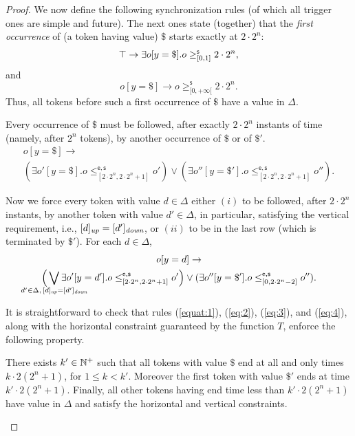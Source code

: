 \begin{proof}
We now define the following synchronization rules (of which all trigger ones are simple and future). The next ones state (together) that the \emph{first occurrence} of (a token having value) $\$$ starts exactly at $2\cdot 2^n$:
\begin{equation}\label{equat:1}
    \operatorname{\top} \to \exists o[y=\$]. o\geq^{\mathsf{s}}_{[0,1]} 2\cdot 2^n ,
\end{equation}
and 
\begin{equation}\label{eq:2}
    o[y=\$] \to  o\geq^{\mathsf{s}}_{[0,+\infty[} 2\cdot 2^n.
\end{equation}
Thus, all tokens before such a first occurrence of $\$$ have a value in $\Delta$.

Every occurrence of $\$$ must be followed, after exactly $2\cdot 2^n$ instants of time (namely, after $2^n$ tokens), by another occurrence of $\$$ or of $\$'$.
\begin{multline}\label{eq:3}
o[y=\$]\to \\ (\exists o'[y=\$]. o\leq ^{\mathsf{e},\mathsf{s}}_{[2\cdot 2^n,2\cdot 2^n+1]} o') \vee (\exists o''[y=\$']. o\leq ^{\mathsf{e},\mathsf{s}}_{[2\cdot 2^n,2\cdot 2^n+1]} o'').
\end{multline}

Now we force every token with value $d\in \Delta$ either $(i)$ to be followed, after $2\cdot 2^n$ instants, by another token with value  $d'\in\Delta$, in particular, satisfying the vertical requirement, i.e., $[d]_{\textit{up}}=[d']_{\textit{down}}$, or $(ii)$ to be in the last row (which is terminated by $\$'$). For each $d\in \Delta$, 
\begin{multline}\label{eq:4}
o[y=d]\to \\ \Big(\smashoperator{\bigvee_{d'\in\Delta, \,[d]_{\Up}=[d']_{\Down}}} \exists o'[y=d']. o\leq ^{\mathsf{e},\mathsf{s}}_{[2\cdot 2^n,2\cdot 2^n+1]} o'\Big) \vee (\exists o''[y=\$']. o\leq ^{\mathsf{e},\mathsf{s}}_{[0,2\cdot 2^n-2]} o'').
\end{multline}

It is straightforward to check that rules (\ref{equat:1}), (\ref{eq:2}), (\ref{eq:3}), and (\ref{eq:4}), along with the horizontal constraint guaranteed by the function $T$, enforce the following property.
\begin{proposition}
There exists $k'\in\mathbb{N}^+$ such that
all tokens with value $\$$ end at all and only times $k\cdot 2(2^n+1)$, for $1\leq k< k'$. Moreover the first token with value $\$'$ ends at time $k'\cdot 2(2^n+1)$. Finally, all other tokens having end time less than $k'\cdot 2(2^n+1)$ have value in $\Delta$ and satisfy the horizontal and vertical constraints.
\end{proposition}


\end{proof}
